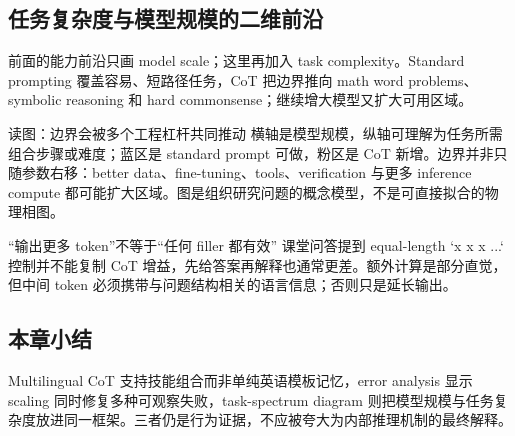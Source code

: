 \subsection{任务复杂度与模型规模的二维前沿}

前面的能力前沿只画 model scale；这里再加入 task complexity。Standard prompting 覆盖容易、短路径任务，CoT 把边界推向 math word problems、symbolic reasoning 和 hard commonsense；继续增大模型又扩大可用区域。


\begin{knowledgebox}{读图：边界会被多个工程杠杆共同推动}
横轴是模型规模，纵轴可理解为任务所需组合步骤或难度；蓝区是 standard prompt 可做，粉区是 CoT 新增。边界并非只随参数右移：better data、fine-tuning、tools、verification 与更多 inference compute 都可能扩大区域。图是组织研究问题的概念模型，不是可直接拟合的物理相图。
\end{knowledgebox}

\begin{warningbox}{“输出更多 token”不等于“任何 filler 都有效”}
课堂问答提到 equal-length `x x x ...` 控制并不能复制 CoT 增益，先给答案再解释也通常更差。额外计算是部分直觉，但中间 token 必须携带与问题结构相关的语言信息；否则只是延长输出。
\end{warningbox}

\subsection{本章小结}

Multilingual CoT 支持技能组合而非单纯英语模板记忆，error analysis 显示 scaling 同时修复多种可观察失败，task-spectrum diagram 则把模型规模与任务复杂度放进同一框架。三者仍是行为证据，不应被夸大为内部推理机制的最终解释。

